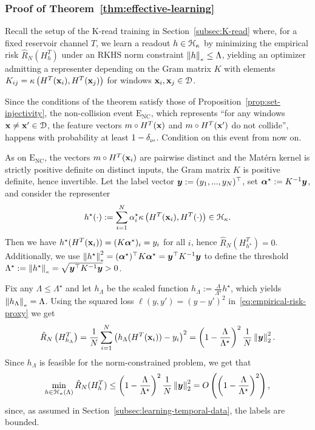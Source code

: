 \subsubsection{Proof of Theorem~\ref{thm:effective-learning}}\label{subsubsection:proof-thm-effective-learning}
Recall the setup of the K-read training in Section~\ref{subsec:K-read} where, for a fixed reservoir channel $T$, we learn a readout $h \in {\mathcal{H}}_{\kappa}$ by minimizing the empirical risk $\hat{R}_N(H^T_h)$ under an RKHS norm constraint $\left\lVert h\right\rVert_{\scriptscriptstyle \kappa} \leq \Lambda$, yielding an optimizer admitting a representer depending on the Gram matrix $K$ with elements $K_{ij} = \kappa\left(H^T({\mathbf{x}}_i), H^T({\mathbf{x}}_j)\right)$ for windows ${\mathbf{x}}_i, {\mathbf{x}}_j \in {\mathcal{D}}$. 

Since the conditions of the theorem satisfy those of Proposition~\ref{prop:set-injectivity}, the non-collision event $\mathrm{E_{NC}}$, which represents ``for any windows ${\mathbf{x}} \neq {\mathbf{x}}' \in {\mathcal{D}}$, the feature vectors $m \circ H^T({\mathbf{x}})$ and $m \circ H^T({\mathbf{x}}')$ do not collide'', happens with probability at least $1- \delta_{\scriptscriptstyle \operatorname{pr}}$. Condition on this event from now on.

As on $\mathrm{E_{NC}}$, the vectors $m \circ H^T({\mathbf{x}}_i)$ are pairwise distinct and the Mat\'ern kernel is strictly positive definite on distinct inputs, the Gram matrix $K$ is positive definite, hence invertible. Let the label vector ${\bm{y}} := (y_1, ..., y_N)^\top$, set $\bm{\alpha}^\star := K^{-1} {\bm{y}}$, and consider the representer
\begin{equation*}
    h^\star(\cdot) := \sum_{i=1}^N \alpha^\star_i \kappa\left(H^T({\mathbf{x}}_i), H^T(\cdot)\right) \in {\mathcal{H}}_{\kappa}.
\end{equation*}
Then we have $h^\star(H^T({\mathbf{x}}_i)) = (K \bm{\alpha}^\star)_i = y_i$ for all $i$, hence $\hat{R}_N(H^T_{h^\star}) = 0$. Additionally, we use $\left\lVert h^\star\right\rVert_{\scriptscriptstyle \kappa}^2 = (\bm{\alpha}^\star)^\top K \bm{\alpha}^\star = {\bm{y}}^\top K^{-1} {\bm{y}}$ to define the threshold $\Lambda^\star := \left\lVert h^\star\right\rVert_{\scriptscriptstyle \kappa}= \sqrt{{\bm{y}}^\top K^{-1} {\bm{y}}} > 0$.

Fix any $\Lambda \leq \Lambda^\star$ and let $h_\Lambda$ be the scaled function $h_\Lambda := \tfrac{\Lambda}{\Lambda^\star} h^\star$, which yields $\left\lVert h_\Lambda\right\rVert_{\scriptscriptstyle \kappa} = \Lambda$. Using the squared loss $\ell(y,y') = (y-y')^2$ in~\cref{eq:empirical-risk-proxy} we get
\begin{equation*}
    \hat{R}_N\left(H^T_{h_\Lambda}\right) = \frac{1}{N} \sum_{i=1}^N \left(h_\Lambda(H^T({\mathbf{x}}_i)) - y_i\right)^2 = \left(1 - \frac{\Lambda}{\Lambda^\star}\right)^2 \frac{1}{N}\left\lVert{\bm{y}}\right\rVert_{2}^2.
\end{equation*}
Since $h_\Lambda$ is feasible for the norm-constrained problem, we get that
\begin{equation*}
    \min_{h\in {\mathcal{H}}_{\kappa}(\Lambda)} \hat{R}_N(H^T_h) \leq \left(1 - \frac{\Lambda}{\Lambda^\star}\right)^2 \frac{1}{N}\left\lVert{\bm{y}}\right\rVert_{2}^2 = O\left(\left(1 - \frac{\Lambda}{\Lambda^\star}\right)^2\right),
\end{equation*}
since, as assumed in Section~\ref{subsec:learning-temporal-data}, the labels are bounded.

